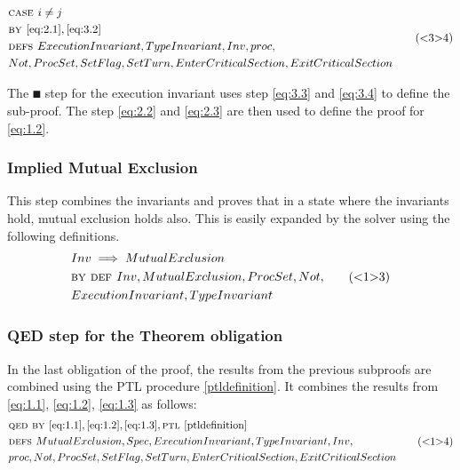 \documentclass[fleqn]{tukseminar}
\begin{document}
			\begin{equation}\label{eq:3.4}
				\begin{aligned}
					& \textsc{case } i \neq j\\
					& \textsc{by } \ref{eq:2.1}, \ref{eq:3.2}\\
					& \textsc{defs } ExecutionInvariant, TypeInvariant, Inv, proc,\\
					& Not,ProcSet,SetFlag, SetTurn, EnterCriticalSection, ExitCriticalSection
				\end{aligned}
				\tag{<3>4}
			\end{equation}
			
			The $\QED$ step for the execution invariant uses step \ref{eq:3.3} and \ref{eq:3.4} to define the sub-proof. The step \ref{eq:2.2} and \ref{eq:2.3} are then used to define the proof for  \ref{eq:1.2}.
			
			\subsubsection{Implied Mutual Exclusion}
			
			This step combines the invariants and proves that in a state where the invariants hold, mutual exclusion holds also. This is easily expanded by the solver using the following definitions.
			\begin{equation} \label{eq:1.3}
				\begin{aligned}
					&Inv \implies MutualExclusion\\
					& \textsc{by } \textsc{def } Inv, MutualExclusion,ProcSet,Not,\\
					& ExecutionInvariant,TypeInvariant
				\end{aligned}
				\tag{<1>3}
			\end{equation}
			
		
			\subsubsection{ QED step for the Theorem obligation}
				In the last obligation of the proof, the results from the previous subproofs are combined using the PTL procedure \ref{ptldefinition}. It combines the results from \ref{eq:1.1},  \ref{eq:1.2},  \ref{eq:1.3} as follows:
			\begin{equation}\label{eq:1.4}
				\begin{aligned}
					& \textsc{qed } \textsc{by }  \ref{eq:1.1},  \ref{eq:1.2},  \ref{eq:1.3}, \textsc{ptl } \ref{ptldefinition}\\
					& \textsc{defs } MutualExclusion,Spec,ExecutionInvariant, TypeInvariant, Inv, \\
					&proc, Not,ProcSet, SetFlag, SetTurn, EnterCriticalSection, ExitCriticalSection
				\end{aligned}
				\tag{<1>4}
			\end{equation}
		
\end{document}
